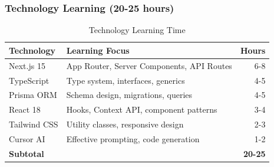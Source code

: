 \documentclass[11pt,a4paper]{article}
\begin{document}
\subsubsection{Technology Learning (20-25 hours)}
\begin{table}[h]
\centering
\begin{tabular}{llr}
\toprule
\textbf{Technology} & \textbf{Learning Focus} & \textbf{Hours} \\
\midrule
Next.js 15 & App Router, Server Components, API Routes & 6-8 \\
TypeScript & Type system, interfaces, generics & 4-5 \\
Prisma ORM & Schema design, migrations, queries & 4-5 \\
React 18 & Hooks, Context API, component patterns & 3-4 \\
Tailwind CSS & Utility classes, responsive design & 2-3 \\
Cursor AI & Effective prompting, code generation & 1-2 \\
\bottomrule
\textbf{Subtotal} & & \textbf{20-25} \\
\bottomrule
\end{tabular}
\caption{Technology Learning Time}
\end{table}
\end{document}

